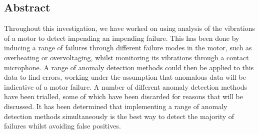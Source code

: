 	\title{\normalfont{}}
	\author{\\
		\\ {\textit{Department of Physics, Durham University}}}
	\date{\today}
\maketitle
	
\begin{center}
	\begin{tcolorbox}[colback=white,width=\textwidth,colframe=white]
		\section*{\large Abstract}
		\small
		Throughout this investigation, we have worked on using analysis of the vibrations of a motor to detect impending an impending failure. This has been done by inducing a range of failures through different failure modes in the motor, such as overheating or overvoltaging, whilst monitoring its vibrations through a contact microphone. A range of anomaly detection methods could then be applied to this data to find errors, working under the assumption that anomalous data will be indicative of a motor failure. A number of different anomaly detection methods have been trialled, some of which have been discarded for reasons that will be discussed. It has been determined that implementing a range of anomaly detection methods simultaneously is the best way to detect the majority of failures whilst avoiding false positives.
	\end{tcolorbox}
\end{center}
		
\newpage

\tableofcontents
\clearpage
\listoffigures
\listoftables
\clearpage
